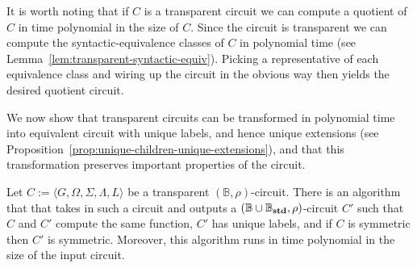 \documentclass[../paper.tex]{subfiles}
\begin{document}
It is worth noting that if $C$ is a transparent circuit we can compute a
quotient of $C$ in time polynomial in the size of $C$. Since the circuit is
transparent we can compute the syntactic-equivalence classes of $C$ in
polynomial time (see Lemma~\ref{lem:transparent-syntactic-equiv}). Picking a
representative of each equivalence class and wiring up the circuit in the
obvious way then yields the desired quotient circuit.

We now show that transparent circuits can be transformed in polynomial time into
equivalent circuit with unique labels, and hence unique extensions (see
Proposition~\ref{prop:unique-children-unique-extensions}), and that this
transformation preserves important properties of the circuit.

\begin{lem}
  Let $C := \langle G, \Omega, \Sigma, \Lambda, L \rangle$ be a transparent
  $(\mathbb{B}, \rho)$-circuit. There is an algorithm that that takes in such a
  circuit and outputs a $(\mathbb{B} \cup \mathbb{B}_{\text{\textbf{std}}}, \rho)$-circuit $C'$
  such that $C$ and $C'$ compute the same function, $C'$ has unique labels, and
  if $C$ is symmetric then $C'$ is symmetric. Moreover, this algorithm runs in
  time polynomial in the size of the input circuit.
  \label{lem:transparent-unique}
\end{lem}
\end{document}
